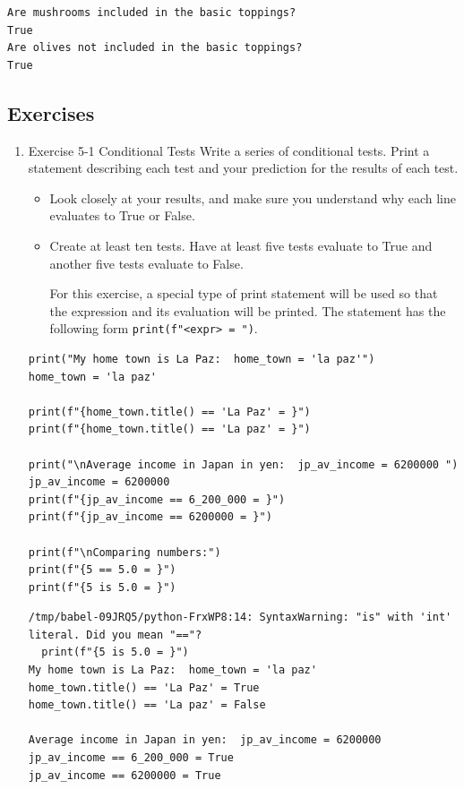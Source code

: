 \documentclass[10pt]{book}
\begin{document}
\label{orgb76241c}
\begin{verbatim}
Are mushrooms included in the basic toppings?
True
Are olives not included in the basic toppings?
True
\end{verbatim}
\subsection{Exercises}
\label{sec:org1824bd6}
\begin{enumerate}
\item Exercise 5-1 Conditional Tests
\label{sec:orgf72a245}
Write a series of conditional tests. Print a statement describing each test and your prediction for the results of each test.
\begin{itemize}
\item Look closely at your results, and make sure you understand why each line evaluates to True or False.
\item Create at least ten tests. Have at least five tests evaluate to True and another five tests evaluate to False.

For this exercise, a special type of print statement will be used so that the expression and its evaluation will be printed. The statement has the following form \texttt{print(f"{<expr> = }")}.
\end{itemize}
\begin{verbatim}
print("My home town is La Paz:  home_town = 'la paz'")
home_town = 'la paz'

print(f"{home_town.title() == 'La Paz' = }")
print(f"{home_town.title() == 'La paz' = }")

print("\nAverage income in Japan in yen:  jp_av_income = 6200000 ")
jp_av_income = 6200000
print(f"{jp_av_income == 6_200_000 = }")
print(f"{jp_av_income == 6200000 = }")

print(f"\nComparing numbers:")
print(f"{5 == 5.0 = }")
print(f"{5 is 5.0 = }")
\end{verbatim}

\label{orgbaec065}
\begin{verbatim}
/tmp/babel-09JRQ5/python-FrxWP8:14: SyntaxWarning: "is" with 'int' literal. Did you mean "=="?
  print(f"{5 is 5.0 = }")
My home town is La Paz:  home_town = 'la paz'
home_town.title() == 'La Paz' = True
home_town.title() == 'La paz' = False

Average income in Japan in yen:  jp_av_income = 6200000 
jp_av_income == 6_200_000 = True
jp_av_income == 6200000 = True


\end{verbatim}
\end{enumerate}
\end{document}
